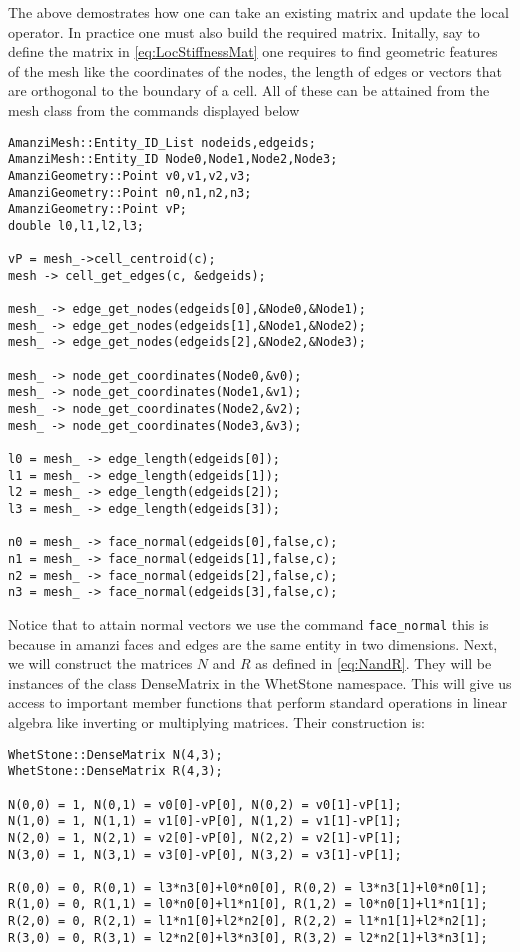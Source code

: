 %
The above demostrates how one can take an existing matrix and update the local operator. 
%
In practice one must also build the required matrix.
%
Initally, say to define the matrix in \eqref{eq:LocStiffnessMat} one requires to find geometric features of the mesh like the coordinates of the nodes, the length of edges or vectors that are orthogonal to the boundary of a cell.
%
All of these can be attained from the mesh class from the commands displayed below
%
\begin{lstlisting}
AmanziMesh::Entity_ID_List nodeids,edgeids;
AmanziMesh::Entity_ID Node0,Node1,Node2,Node3;
AmanziGeometry::Point v0,v1,v2,v3;
AmanziGeometry::Point n0,n1,n2,n3;
AmanziGeometry::Point vP;
double l0,l1,l2,l3;

vP = mesh_->cell_centroid(c);
mesh -> cell_get_edges(c, &edgeids);

mesh_ -> edge_get_nodes(edgeids[0],&Node0,&Node1);
mesh_ -> edge_get_nodes(edgeids[1],&Node1,&Node2);
mesh_ -> edge_get_nodes(edgeids[2],&Node2,&Node3);

mesh_ -> node_get_coordinates(Node0,&v0);
mesh_ -> node_get_coordinates(Node1,&v1);
mesh_ -> node_get_coordinates(Node2,&v2);  
mesh_ -> node_get_coordinates(Node3,&v3);

l0 = mesh_ -> edge_length(edgeids[0]);
l1 = mesh_ -> edge_length(edgeids[1]);
l2 = mesh_ -> edge_length(edgeids[2]);
l3 = mesh_ -> edge_length(edgeids[3]);

n0 = mesh_ -> face_normal(edgeids[0],false,c);
n1 = mesh_ -> face_normal(edgeids[1],false,c);
n2 = mesh_ -> face_normal(edgeids[2],false,c);
n3 = mesh_ -> face_normal(edgeids[3],false,c); 
\end{lstlisting}
%
Notice that to attain normal vectors we use the command {\tt face\_normal} this is because in amanzi faces and edges are the same entity in two dimensions.
%
Next, we will construct the matrices $N$ and $R$ as defined in \eqref{eq:NandR}.
%
They will be instances of the class DenseMatrix in the WhetStone namespace.
%
This will give us access to important member functions that perform standard operations in linear algebra like inverting or multiplying matrices. 
%
Their construction is:
%
\begin{lstlisting}
WhetStone::DenseMatrix N(4,3);
WhetStone::DenseMatrix R(4,3);

N(0,0) = 1, N(0,1) = v0[0]-vP[0], N(0,2) = v0[1]-vP[1];  
N(1,0) = 1, N(1,1) = v1[0]-vP[0], N(1,2) = v1[1]-vP[1];
N(2,0) = 1, N(2,1) = v2[0]-vP[0], N(2,2) = v2[1]-vP[1];
N(3,0) = 1, N(3,1) = v3[0]-vP[0], N(3,2) = v3[1]-vP[1];

R(0,0) = 0, R(0,1) = l3*n3[0]+l0*n0[0], R(0,2) = l3*n3[1]+l0*n0[1];
R(1,0) = 0, R(1,1) = l0*n0[0]+l1*n1[0], R(1,2) = l0*n0[1]+l1*n1[1];
R(2,0) = 0, R(2,1) = l1*n1[0]+l2*n2[0], R(2,2) = l1*n1[1]+l2*n2[1];
R(3,0) = 0, R(3,1) = l2*n2[0]+l3*n3[0], R(3,2) = l2*n2[1]+l3*n3[1];
\end{lstlisting}
